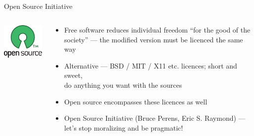 \documentclass{beamer}
\begin{document}
\subsection{}
\begin{frame}{Open Source Initiative}
\begin{columns}
\begin{column}{4cm}
\includegraphics[width=4cm]{opensource-rgb.pdf}
\end{column}
\begin{column}{7cm}
\begin{itemize}
\item Free software reduces individual freedom ``for the good of the society'' --- the modified version must be licenced the same way
\item Alternative --- BSD / MIT / X11 etc. licences; short and sweet,\\do anything you want with the sources
\item Open source encompasses these licences as well
\item Open Source Initiative (Bruce Perens, Eric S. Raymond) --- let's stop moralizing and be pragmatic!
\end{itemize}
\end{column}
\end{columns}
\end{frame}
\end{document}
